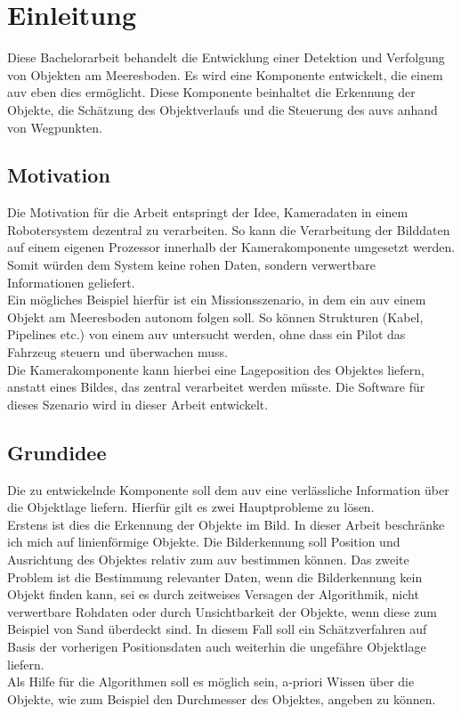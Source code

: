 \section{Einleitung}
Diese Bachelorarbeit behandelt die Entwicklung einer Detektion und Verfolgung von Objekten am Meeresboden. Es wird eine Komponente entwickelt, die einem \gls{auv} eben dies ermöglicht. Diese Komponente beinhaltet die Erkennung der Objekte, die Schätzung des Objektverlaufs und die Steuerung des \gls{auv}s anhand von Wegpunkten.
\subsection{Motivation}
Die Motivation für die Arbeit entspringt der Idee, Kameradaten in einem Robotersystem dezentral zu verarbeiten. So kann die Verarbeitung der Bilddaten auf einem eigenen Prozessor innerhalb der Kamerakomponente umgesetzt werden. Somit würden dem System keine rohen Daten, sondern verwertbare Informationen geliefert.\\
Ein mögliches Beispiel hierfür ist ein Missionsszenario, in dem ein \gls{auv} einem Objekt am Meeresboden autonom folgen soll. So können Strukturen (Kabel, Pipelines etc.) von einem \gls{auv} untersucht werden, ohne dass ein Pilot das Fahrzeug steuern und überwachen muss.\\
Die Kamerakomponente kann hierbei eine Lageposition des Objektes liefern, anstatt eines Bildes, das zentral verarbeitet werden müsste. Die Software für dieses Szenario wird in dieser Arbeit entwickelt.\\

\subsection{Grundidee}
Die zu entwickelnde Komponente soll dem \gls{auv} eine verlässliche Information über die Objektlage liefern. Hierfür gilt es zwei Hauptprobleme zu lösen.\\
Erstens ist dies die Erkennung der Objekte im Bild. In dieser Arbeit beschränke ich mich auf linienförmige Objekte. Die Bilderkennung soll Position und Ausrichtung des Objektes relativ zum \gls{auv} bestimmen können.
Das zweite Problem ist die Bestimmung relevanter Daten, wenn die Bilderkennung kein Objekt finden kann, sei es durch zeitweises Versagen der Algorithmik, nicht verwertbare Rohdaten oder durch Unsichtbarkeit der Objekte, wenn diese zum Beispiel von Sand überdeckt sind.
In diesem Fall soll ein Schätzverfahren auf Basis der vorherigen Positionsdaten auch weiterhin die ungefähre Objektlage liefern.\\
Als Hilfe für die Algorithmen soll es möglich sein, a-priori Wissen über die Objekte, wie zum Beispiel den Durchmesser des Objektes, angeben zu können.
